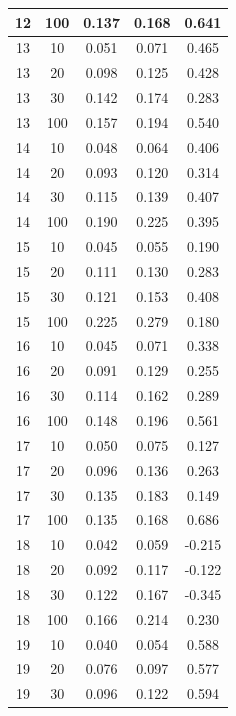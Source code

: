 \begin{longtable}{ |c|c|c|c|c| }
            12 & 100 & 0.137 & 0.168 & 0.641 \\ \hline
            13 & 10 & 0.051 & 0.071 & 0.465 \\ \hline
            13 & 20 & 0.098 & 0.125 & 0.428 \\ \hline
            13 & 30 & 0.142 & 0.174 & 0.283 \\ \hline
            13 & 100 & 0.157 & 0.194 & 0.540 \\ \hline
            14 & 10 & 0.048 & 0.064 & 0.406 \\ \hline
            14 & 20 & 0.093 & 0.120 & 0.314 \\ \hline
            14 & 30 & 0.115 & 0.139 & 0.407 \\ \hline
            14 & 100 & 0.190 & 0.225 & 0.395 \\ \hline
            15 & 10 & 0.045 & 0.055 & 0.190 \\ \hline
            15 & 20 & 0.111 & 0.130 & 0.283 \\ \hline
            15 & 30 & 0.121 & 0.153 & 0.408 \\ \hline
            15 & 100 & 0.225 & 0.279 & 0.180 \\ \hline
            16 & 10 & 0.045 & 0.071 & 0.338 \\ \hline
            16 & 20 & 0.091 & 0.129 & 0.255 \\ \hline
            16 & 30 & 0.114 & 0.162 & 0.289 \\ \hline
            16 & 100 & 0.148 & 0.196 & 0.561 \\ \hline
            17 & 10 & 0.050 & 0.075 & 0.127 \\ \hline
            17 & 20 & 0.096 & 0.136 & 0.263 \\ \hline
            17 & 30 & 0.135 & 0.183 & 0.149 \\ \hline
            17 & 100 & 0.135 & 0.168 & 0.686 \\ \hline
            18 & 10 & 0.042 & 0.059 & -0.215 \\ \hline
            18 & 20 & 0.092 & 0.117 & -0.122 \\ \hline
            18 & 30 & 0.122 & 0.167 & -0.345 \\ \hline
            18 & 100 & 0.166 & 0.214 & 0.230 \\ \hline
            19 & 10 & 0.040 & 0.054 & 0.588 \\ \hline
            19 & 20 & 0.076 & 0.097 & 0.577 \\ \hline
            19 & 30 & 0.096 & 0.122 & 0.594 \\ \hline

\end{longtable}
